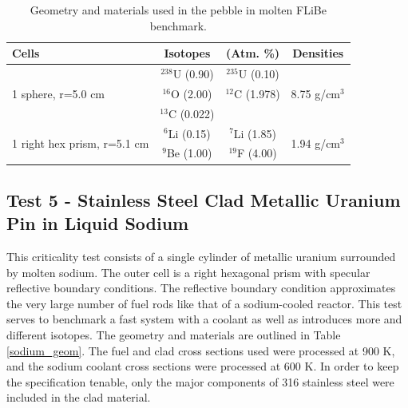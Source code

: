 \documentclass[preprint,12pt]{elsarticle}
\begin{document}
\begin{table}[h]
\centering
\caption{Geometry and materials used in the pebble in molten FLiBe benchmark.}
\label{pebble_geom}
\begin{tabular}{| l | c  c | c |}
\hline
Cells & Isotopes & (Atm.  \%)& Densities \\
\hline
\multirow{3}{*}{1 sphere, r=5.0 cm }  &   $^{238}$U   (0.90) &  $^{235}$U   (0.10) &  \multirow{3}{*}{8.75 g/cm$^3$} \\
                                      &   $^{16}$O    (2.00) &  $^{12}$C    (1.978) &  \\
                                      &   $^{13}$C    (0.022)&                     &  \\
\hline
\multirow{2}{*}{1 right hex prism, r=5.1 cm }  &   $^{6}$Li  (0.15) &  $^{7}$Li  (1.85)&  \multirow{2}{*}{1.94 g/cm$^3$} \\
                                               &  $^{9}$Be  (1.00) & $^{19}$F  (4.00) &  \\
\hline
\end{tabular}
\end{table}

\subsection{Test 5 - Stainless Steel Clad Metallic Uranium Pin in Liquid Sodium}

This criticality test consists of a single cylinder of metallic uranium surrounded by molten sodium.  The outer cell is a right hexagonal prism with specular reflective boundary conditions.  The reflective boundary condition approximates the very large number of fuel rods like that of a sodium-cooled reactor.  This test serves to benchmark a fast system with a coolant as well as introduces more and different isotopes.  The geometry and materials are outlined in Table \ref{sodium_geom}.  The fuel and clad cross sections used were processed at 900 K, and the sodium coolant cross sections were processed at 600 K.  In order to keep the specification tenable, only the major components of 316 stainless steel were included in the clad material. 
\end{document}
